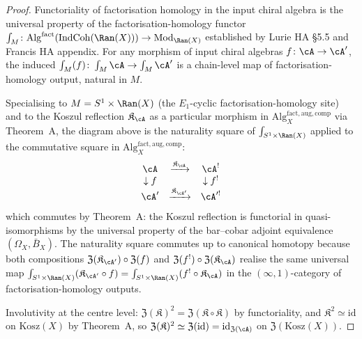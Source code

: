 \begin{proof}
Functoriality of factorisation homology in the input chiral algebra is the
universal property of the factorisation-homology functor $\int_M \colon
\mathrm{Alg}^{\mathrm{fact}}(\mathrm{IndCoh}(\Ran(X))) \to \mathrm{Mod}_{\Ran(X)}$
established by Lurie HA \S 5.5 and Francis HA appendix. For any morphism
of input chiral algebras $f \colon \cA \to \cA'$, the induced
$\int_M(f) \colon \int_M \cA \to \int_M \cA'$ is a chain-level map of
factorisation-homology output, natural in $M$.

Specialising to $M = S^1 \times \Ran(X)$ \textup{(}the $E_1$-cyclic
factorisation-homology site\textup{)} and to the Koszul reflection
$\mathfrak{K}_\cA$ as a particular morphism in
$\mathrm{Alg}^{\mathrm{fact, aug, comp}}_X$ via Theorem~A,
the diagram above is the naturality square of $\int_{S^1 \times \Ran(X)}$
applied to the commutative square in
$\mathrm{Alg}^{\mathrm{fact, aug, comp}}_X$:
\[
 \begin{array}{ccc}
 \cA & \xrightarrow{\mathfrak{K}_\cA} & \cA^! \\
 \downarrow{f} & & \downarrow{f^!} \\
 \cA' & \xrightarrow{\mathfrak{K}_{\cA'}} & \cA'^!
 \end{array}
\]
which commutes by Theorem~A: the Koszul reflection is functorial in
quasi-isomorphisms by the universal property of the bar--cobar adjoint
equivalence $(\Omega_X, \bar{B}_X)$. The naturality square commutes up
to canonical homotopy because both compositions
$\mathfrak{Z}(\mathfrak{K}_{\cA'}) \circ \mathfrak{Z}(f)$ and
$\mathfrak{Z}(f^!) \circ \mathfrak{Z}(\mathfrak{K}_\cA)$ realise the same
universal map $\int_{S^1 \times \Ran(X)}(\mathfrak{K}_{\cA'} \circ f)
= \int_{S^1 \times \Ran(X)}(f^! \circ \mathfrak{K}_\cA)$ in the
$(\infty, 1)$-category of factorisation-homology outputs.

Involutivity at the centre level: $\mathfrak{Z}(\mathfrak{K})^2 =
\mathfrak{Z}(\mathfrak{K} \circ \mathfrak{K})$ by functoriality, and
$\mathfrak{K}^2 \simeq \mathrm{id}$ on $\mathrm{Kosz}(X)$ by Theorem~A,
so $\mathfrak{Z}(\mathfrak{K})^2 \simeq \mathfrak{Z}(\mathrm{id}) =
\mathrm{id}_{\mathfrak{Z}(\cA)}$ on $\mathfrak{Z}(\mathrm{Kosz}(X))$.
\end{proof}

